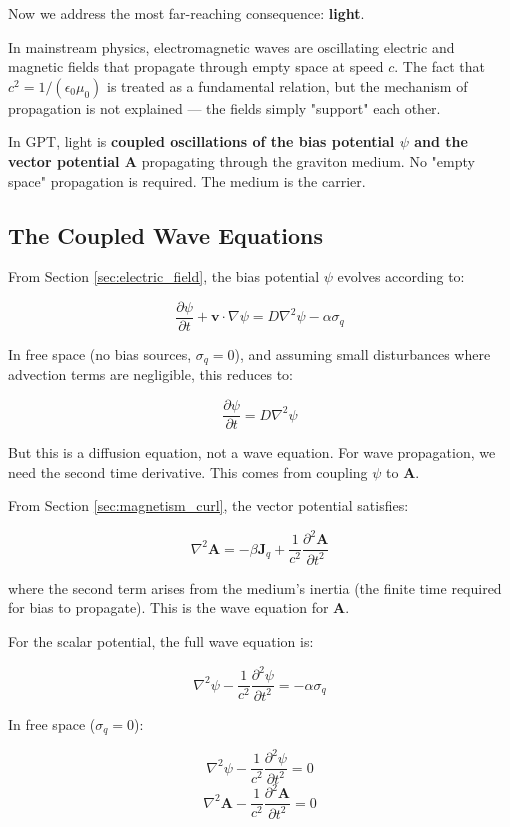 \documentclass[12pt, a4paper]{article}
\begin{document}
Now we address the most far-reaching consequence: \textbf{light}.

In mainstream physics, electromagnetic waves are oscillating electric and magnetic fields that propagate through empty space at speed \( c \). The fact that \( c^2 = 1/(\epsilon_0 \mu_0) \) is treated as a fundamental relation, but the mechanism of propagation is not explained — the fields simply "support" each other.

In GPT, light is \textbf{coupled oscillations of the bias potential \( \psi \) and the vector potential \( \mathbf{A} \)} propagating through the graviton medium. No "empty space" propagation is required. The medium is the carrier.

\subsection{The Coupled Wave Equations}
\label{subsec:wave_equations}

From Section \ref{sec:electric_field}, the bias potential \( \psi \) evolves according to:

\[
\frac{\partial \psi}{\partial t} + \mathbf{v} \cdot \nabla \psi = D \nabla^2 \psi - \alpha \sigma_q
\]

In free space (no bias sources, \( \sigma_q = 0 \)), and assuming small disturbances where advection terms are negligible, this reduces to:

\[
\frac{\partial \psi}{\partial t} = D \nabla^2 \psi
\]

But this is a diffusion equation, not a wave equation. For wave propagation, we need the second time derivative. This comes from coupling \( \psi \) to \( \mathbf{A} \).

From Section \ref{sec:magnetism_curl}, the vector potential satisfies:

\[
\nabla^2 \mathbf{A} = -\beta \mathbf{J}_q + \frac{1}{c^2} \frac{\partial^2 \mathbf{A}}{\partial t^2}
\]

where the second term arises from the medium's inertia (the finite time required for bias to propagate). This is the wave equation for \( \mathbf{A} \).

For the scalar potential, the full wave equation is:

\[
\nabla^2 \psi - \frac{1}{c^2} \frac{\partial^2 \psi}{\partial t^2} = -\alpha \sigma_q
\]

In free space (\( \sigma_q = 0 \)):

\[
\nabla^2 \psi - \frac{1}{c^2} \frac{\partial^2 \psi}{\partial t^2} = 0
\]
\[
\nabla^2 \mathbf{A} - \frac{1}{c^2} \frac{\partial^2 \mathbf{A}}{\partial t^2} = 0
\]
\end{document}
